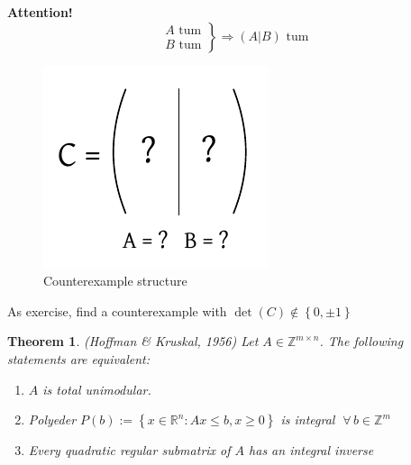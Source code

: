 \documentclass{article}
\newtheorem{theorem}{Theorem}
\newcommand{\set}[1]{\left\{#1\right\}}
\newcommand{\fall}{\;\forall\,}
\begin{document}
\textbf{Attention!}
  \[
    \left.\begin{array}{c}
      A \text{ tum} \\
      B \text{ tum}
    \end{array}\right\} \Rightarrow (A | B) \text{ tum}
  \]
  \begin{figure}[!ht]
    \begin{center}
      \includegraphics{img/tum_counterexample.pdf}
      \caption{Counterexample structure}
    \end{center}
  \end{figure}
  As exercise, find a counterexample with $\det(C) \notin \set{0, \pm 1}$

\begin{theorem}\label{satz-7.1}
  (Hoffman \& Kruskal, 1956)
  Let $A \in \mathbb{Z}^{m \times n}$. The following statements are equivalent:
  \begin{enumerate}
    \item $A$ is total unimodular.
    \item Polyeder $P(b) := \set{x \in \mathbb{R}^n: Ax \leq b, x \geq 0}$ is integral $\fall b \in \mathbb{Z}^m$
    \item Every quadratic regular submatrix of $A$ has an integral inverse
  \end{enumerate}
\end{theorem}
\end{document}
